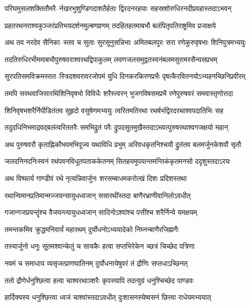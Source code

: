 \twolineshloka
{परिघमुसलशक्तितौमरै--र्नखरभुशुण्डिगदाशतैर्हताः}
{द्विरदनरहयाः सहस्रशोरुधिरनदीप्रवहास्तदाऽभवन्}


\twolineshloka
{प्रहतरथनराश्वकुञ्जरंप्रतिभयदर्शनमुल्बणव्रणम्}
{तदहितहतमाबभौ बलंपितृपतिराष्ट्रमिव प्रजाक्षये}


\twolineshloka
{अथ तव नरदेव सैनिका--स्तव च सुताः सुरसूनुसन्निभाः}
{अमितबलपुरः सरा रणेकुरुवृषभाः शिनिपुत्रमभ्ययुः}


\twolineshloka
{तदतिरुधिरभीममाबभौपुरुषवराश्वरथद्विपाकुलम्}
{लवणजलसमुद्वतस्वनंबलमसुरामरसैन्यसप्रभम्}


\twolineshloka
{सुरपतिसमविक्रमस्तत--स्त्रिदशवरावरजोपमं युधि}
{दिनकरकिरणप्रभैः पृषत्कैरवितनयोऽभ्यहनच्छिनिप्रवीरम्}


\twolineshloka
{तमपि सरथवाजिसारथिंशिनिवृषभो विविधैः शरैस्त्वरन्}
{भुजगविषसमप्रभै रणेपुरुषवरं समवास्तृणोत्तदा}


\twolineshloka
{शिनिवृषभशरैर्निपीडितंतव सुहृदो वसुषेणमभ्ययुः}
{त्वरितमतिरथा रथर्षभंद्विरदरथाश्वपदातिभिः सह}


\twolineshloka
{तदुदधिनिभमाद्रवद्बलंत्वरिततरैः समभिद्रुतं परैः}
{द्रुपदसुतमुखैस्तदाऽभवत्पुरुषरथाश्वगजक्षयो महान्}


\twolineshloka
{अथ पुरुषवरौ कृताह्निकौभवमभिपूज्य यथाविधि प्रभुम्}
{अरिवधकृतनिश्चयौ द्रुतंतव बलमर्जुनकेशवौ सृतौ}


\twolineshloka
{जलदनिनदनिःस्वनं रथंपवनविधूतपताककेतनम्}
{सितहयमुपयान्तमन्तिकंकृतमनसो ददृशुस्तदाऽरयः}


\twolineshloka
{अथ विष्फार्य गाण्डीवं रथे नृत्यन्निवार्जुनः}
{शरसम्बाधमकरोत्खं दिशः प्रदिशस्तथा}


\twolineshloka
{रथान्विमानप्रतिमान्मज्जयन्सायुधध्वजान्}
{ससारथींस्तदा बाणैरभ्राणीवानिलोऽवधीत्}


\twolineshloka
{गजान्गजप्रयन्तॄंश्च वैजयन्त्यायुधध्वजान्}
{सादिनोऽश्वांश्च पत्तींश्च शरैर्निन्ये यमक्षयम्}


\twolineshloka
{तमन्तकमिव क्रुद्धमनिवार्यं महारथम्}
{दुर्योधनोऽभ्ययादेको निघ्नन्बाणैरजिह्मगैः}


\twolineshloka
{तस्यार्जुनो धनुः सूतमश्वान्केतुं च सायकैः}
{हत्वा सप्तभिरेकेन च्छत्रं चिच्छेद पत्रिणा}


\twolineshloka
{नवमं च समाधाय व्यसृजत्प्राणघातिनम्}
{दुर्योधनायेषुवरं तं द्रौणिः सप्तधाऽच्छिनत्}


\twolineshloka
{ततो द्रौणेर्धनुश्छित्वा हत्वा चाश्वरथाञ्शरैः}
{कृपस्यापि तदत्युग्रं धनुश्चिच्छेद पाण्डवः}


\twolineshloka
{हार्दिक्यस्य धनुश्छित्त्वा ध्वजं चाश्वांस्तदाऽवधीत्}
{दुःशासनस्येष्वसनं छित्त्वा राधेयमभ्ययात्}


